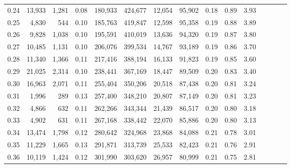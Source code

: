 \begin{tabular}{rrrcrrrrrrrrrrr}
0.24 &  13,933 &  1,281 &                                       0.08 &  180,933 &  424,677 &   12,054 &   95,902 &  0.18 &  0.89 &                         3.93 \\
0.25 &   4,830 &    544 &                                       0.10 &  185,763 &  419,847 &   12,598 &   95,358 &  0.19 &  0.88 &                         3.89 \\
0.26 &   9,828 &  1,038 &                                       0.10 &  195,591 &  410,019 &   13,636 &   94,320 &  0.19 &  0.87 &                         3.80 \\
0.27 &  10,485 &  1,131 &                                       0.10 &  206,076 &  399,534 &   14,767 &   93,189 &  0.19 &  0.86 &                         3.70 \\
0.28 &  11,340 &  1,366 &                                       0.11 &  217,416 &  388,194 &   16,133 &   91,823 &  0.19 &  0.85 &                         3.60 \\
0.29 &  21,025 &  2,314 &                                       0.10 &  238,441 &  367,169 &   18,447 &   89,509 &  0.20 &  0.83 &                         3.40 \\
0.30 &  16,963 &  2,071 &                                       0.11 &  255,404 &  350,206 &   20,518 &   87,438 &  0.20 &  0.81 &                         3.24 \\
0.31 &   1,996 &    289 &                                       0.13 &  257,400 &  348,210 &   20,807 &   87,149 &  0.20 &  0.81 &                         3.23 \\
0.32 &   4,866 &    632 &                                       0.11 &  262,266 &  343,344 &   21,439 &   86,517 &  0.20 &  0.80 &                         3.18 \\
0.33 &   4,902 &    631 &                                       0.11 &  267,168 &  338,442 &   22,070 &   85,886 &  0.20 &  0.80 &                         3.13 \\
0.34 &  13,474 &  1,798 &                                       0.12 &  280,642 &  324,968 &   23,868 &   84,088 &  0.21 &  0.78 &                         3.01 \\
0.35 &  11,229 &  1,665 &                                       0.13 &  291,871 &  313,739 &   25,533 &   82,423 &  0.21 &  0.76 &                         2.91 \\
0.36 &  10,119 &  1,424 &                                       0.12 &  301,990 &  303,620 &   26,957 &   80,999 &  0.21 &  0.75 &                         2.81 \\

\end{tabular}
